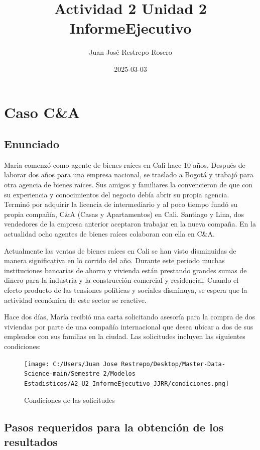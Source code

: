 \documentclass[
]{article}
\title{Actividad 2 Unidad 2 InformeEjecutivo}
\author{Juan José Restrepo Rosero}
\date{2025-03-03}
\begin{document}
\maketitle

{
\setcounter{tocdepth}{2}
\tableofcontents
}
\section{\texorpdfstring{\textbf{Caso C\&A}}{Caso C\&A}}\label{caso-ca}

\subsection{\texorpdfstring{\textbf{Enunciado}}{Enunciado}}\label{enunciado}

Maria comenzó como agente de bienes raíces en Cali hace 10 años. Después
de laborar dos años para una empresa nacional, se traslado a Bogotá y
trabajó para otra agencia de bienes raíces. Sus amigos y familiares la
convencieron de que con su experiencia y conocimientos del negocio debía
abrir su propia agencia. Terminó por adquirir la licencia de
intermediario y al poco tiempo fundó su propia compañía, C\&A (Casas y
Apartamentos) en Cali. Santiago y Lina, dos vendedores de la empresa
anterior aceptaron trabajar en la nueva compaña. En la actualidad ocho
agentes de bienes raíces colaboran con ella en C\&A.

Actualmente las ventas de bienes raíces en Cali se han visto disminuidas
de manera significativa en lo corrido del año. Durante este periodo
muchas instituciones bancarias de ahorro y vivienda están prestando
grandes sumas de dinero para la industria y la construcción comercial y
residencial. Cuando el efecto producto de las tensiones políticas y
sociales disminuya, se espera que la actividad económica de este sector
se reactive.

Hace dos días, María recibió una carta solicitando asesoría para la
compra de dos viviendas por parte de una compañía internacional que
desea ubicar a dos de sus empleados con sus familias en la ciudad. Las
solicitudes incluyen las siguientes condiciones:

\begin{figure}
\centering
\texttt{[image: C:/Users/Juan Jose Restrepo/Desktop/Master-Data-Science-main/Semestre 2/Modelos Estadisticos/A2\_U2\_InformeEjecutivo\_JJRR/condiciones.png]}
\caption{Condiciones de las solicitudes}
\end{figure}

\subsection{\texorpdfstring{\textbf{Pasos requeridos para la obtención
de los
resultados}}{Pasos requeridos para la obtención de los resultados}}\label{pasos-requeridos-para-la-obtenciuxf3n-de-los-resultados}
\end{document}

